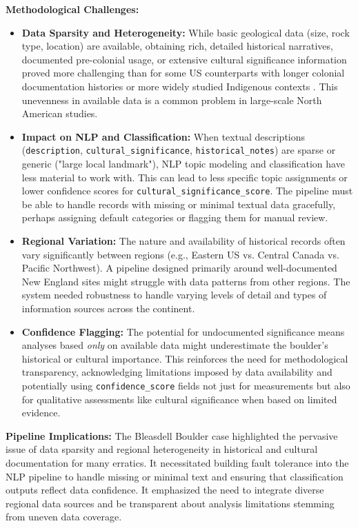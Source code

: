 \documentclass[
11pt, %
english, %
singlespacing, %
headsepline, %
]{MastersDoctoralThesis} %
\begin{document}
\textbf{Methodological Challenges:}
\begin{itemize}
    \item \textbf{Data Sparsity and Heterogeneity:} While basic geological data (size, rock type, location) are available, obtaining rich, detailed historical narratives, documented pre-colonial usage, or extensive cultural significance information proved more challenging than for some US counterparts with longer colonial documentation histories or more widely studied Indigenous contexts \cite{Delcourt1991}. This unevenness in available data is a common problem in large-scale North American studies.
    \item \textbf{Impact on NLP and Classification:} When textual descriptions (\texttt{description}, \texttt{cultural\_significance}, \texttt{historical\_notes}) are sparse or generic ("large local landmark"), NLP topic modeling and classification have less material to work with. This can lead to less specific topic assignments or lower confidence scores for \texttt{cultural\_significance\_score}. The pipeline must be able to handle records with missing or minimal textual data gracefully, perhaps assigning default categories or flagging them for manual review.
    \item \textbf{Regional Variation:} The nature and availability of historical records often vary significantly between regions (e.g., Eastern US vs. Central Canada vs. Pacific Northwest). A pipeline designed primarily around well-documented New England sites might struggle with data patterns from other regions. The system needed robustness to handle varying levels of detail and types of information sources across the continent.
    \item \textbf{Confidence Flagging:} The potential for undocumented significance means analyses based \emph{only} on available data might underestimate the boulder's historical or cultural importance. This reinforces the need for methodological transparency, acknowledging limitations imposed by data availability and potentially using \texttt{confidence\_score} fields not just for measurements but also for qualitative assessments like cultural significance when based on limited evidence.
\end{itemize}

\textbf{Pipeline Implications:} The Bleasdell Boulder case highlighted the pervasive issue of data sparsity and regional heterogeneity in historical and cultural documentation for many erratics. It necessitated building fault tolerance into the NLP pipeline to handle missing or minimal text and ensuring that classification outputs reflect data confidence. It emphasized the need to integrate diverse regional data sources and be transparent about analysis limitations stemming from uneven data coverage.
\end{document}
